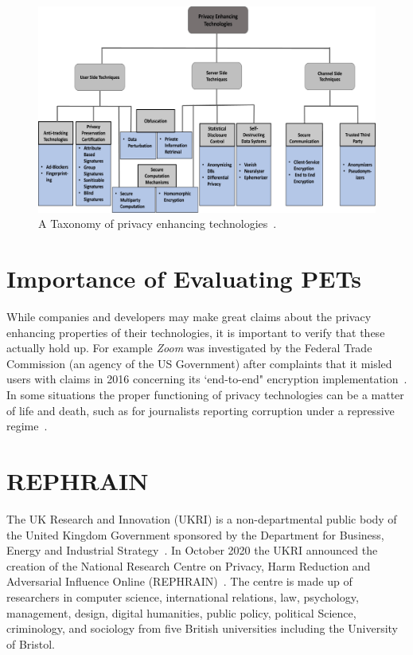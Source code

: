 \documentclass[
    author={Jacob Daniel Halsey},
    supervisor={Prof. Awais Rashid},
    degree={BSc},
    title={Building a Testbed for Evaluating Privacy Enhancing Technologies  (PETs)},
    subtitle={},
    type={software development},
    year={2021}
]{dissertation}
\begin{document}
\begin{figure}
	\centering
	\includegraphics{img/pet_taxonomy}
	\caption{A Taxonomy of privacy enhancing technologies~\cite{kaaniche_2020_privacy}.}
	\label{pet_taxonomy}
\end{figure}

\section{Importance of Evaluating PETs}

While companies and developers may make great claims about the privacy enhancing properties
of their technologies, it is important to verify that these actually hold up.
For example \emph{Zoom} was investigated by the Federal Trade Commission (an agency of the US Government)
after complaints that it misled users with claims in 2016 concerning 
its `end-to-end" encryption implementation~\cite{zoom}.
In some situations the proper functioning of privacy technologies can be a matter of life and
death, such as for journalists reporting corruption under a repressive regime~\cite{transparency}.

\section{REPHRAIN}
\label{sect:rephrain}

The UK Research and Innovation (UKRI) is a non-departmental public body of the United Kingdom Government
sponsored by the Department for Business, Energy and Industrial Strategy~\cite{ukri_who_we_are}.
In October 2020 the UKRI announced the creation of the National Research Centre on Privacy, Harm Reduction
and Adversarial Influence Online (REPHRAIN)~\cite{ukri_new_centre}.
The centre is made up of researchers in computer science, international relations, law, psychology, management,
design, digital humanities, public policy, political Science, criminology, and sociology from five British
universities including the University of Bristol. \\
\end{document}
